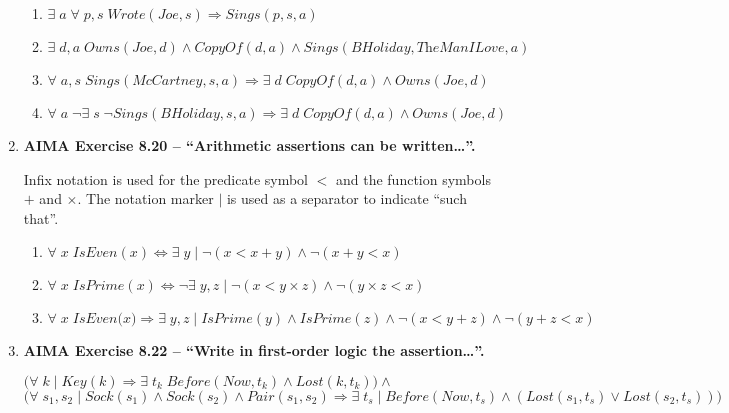 \begin{enumerate}
\begin{enumerate}
\item
$\exists \; a \; \forall \; p, s \; \textit{Wrote}(\textit{Joe}, s) \Rightarrow \textit{Sings}(p, s, a)$

\item
$\exists \; d, a \; \textit{Owns}(\textit{Joe}, d) \land \textit{CopyOf}(d, a) \land \textit{Sings}(\textit{BHoliday}, \textit{TheManILove}, a)$

\item
$\forall \; a, s \; \textit{Sings}(\textit{McCartney}, s, a) \Rightarrow \exists \; d \; \textit{CopyOf}(d, a) \land \textit{Owns}(\textit{Joe}, d)$

\item
$\forall \; a \; \neg \exists \; s \; \neg \textit{Sings}(\textit{BHoliday}, s, a) \Rightarrow \exists \; d \; \textit{CopyOf}(d, a) \land \textit{Owns}(\textit{Joe}, d)$

\end{enumerate}

\item \textbf{AIMA Exercise 8.20 -- ``Arithmetic assertions can be written\ldots''.}

Infix notation is used for the predicate symbol $<$ and the function symbols $+$ and $\times$. The notation marker $|$ is used as a separator to indicate ``such that''.

\begin{enumerate}

\item 
$\forall \; x \; \textit{IsEven}(x) \Leftrightarrow \exists \; y \; | \; \neg (x < x + y) \land \neg (x + y < x)$

\item
$\forall \; x \; \textit{IsPrime}(x) \Leftrightarrow \neg \exists \; y, z \; | \; \neg (x < y \times z) \land \neg (y \times z < x)$

\item
$\forall \; x \; \textit{IsEven(x)} \Rightarrow \exists \; y, z \; | \; \textit{IsPrime}(y) \land \textit{IsPrime}(z) \land \neg (x < y + z) \land \neg (y + z < x)$

\end{enumerate}

\item \textbf{AIMA Exercise 8.22 -- ``Write in first-order logic the assertion\ldots''.}

$\Big(\forall \; k \; | \; \textit{Key}(k) \Rightarrow \exists \; t_k \; \textit{Before}(\textit{Now}, t_k) \land \textit{Lost}(k, t_k) \Big) \land$\\
$\Big(\forall \; s_1, s_2 \; | \; \textit{Sock}(s_1) \land \textit{Sock}(s_2) \land \textit{Pair}(s_1, s_2) \Rightarrow \exists \; t_s \; | \; \textit{Before}(\textit{Now}, t_s) \land (\textit{Lost}(s_1, t_s) \lor \textit{Lost}(s_2, t_s))\Big)$


\end{enumerate}
